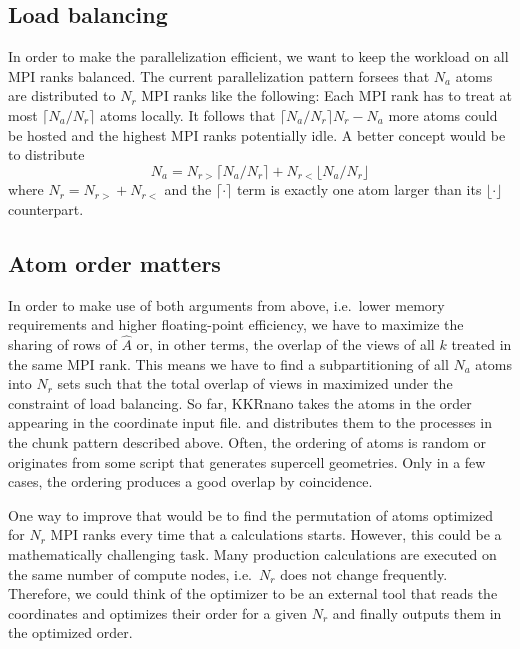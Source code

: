 \documentclass[a4paper]{article}
\newcommand{\MPIrank}{MPI rank} %
\begin{document}
\subsection{Load balancing} \label{sec:load_balancing}

In order to make the parallelization efficient,
we want to keep the workload on all \MPIrank{}s balanced.
The current parallelization pattern forsees that $N_a$ atoms
are distributed to $N_r$ \MPIrank{}s like the following:
Each \MPIrank{} has to treat at most $\lceil N_a/N_r \rceil$ atoms locally.
It follows that $\lceil N_a/N_r \rceil N_r - N_a$ more atoms could be
hosted and the highest \MPIrank{}s potentially idle.
A better concept would be to distribute
\begin{equation}
 N_a = N_{r>} \lceil N_a/N_r \rceil + N_{r<} \lfloor N_a/N_r \rfloor
\end{equation}
where $N_r = N_{r>} + N_{r<}$ and 
the $\lceil \cdot \rceil$ term is exactly one atom larger than its $\lfloor \cdot \rfloor$ counterpart.

\subsection{Atom order matters} \label{sec:atom_order_matters}

In order to make use of both arguments from above,
i.e.~lower memory requirements and higher floating-point efficiency,
we have to maximize the sharing of rows of $\hat A$
or, in other terms, the overlap of the views of all $k$ treated in
the same \MPIrank{}.
This means we have to find a subpartitioning of all $N_a$ atoms into
$N_r$ sets such that the total overlap of views in maximized
under the constraint of load balancing.
So far, KKRnano takes the atoms in the order appearing in the coordinate input file.
and distributes them to the processes in the chunk pattern described above.
Often, the ordering of atoms is random or originates from some script that generates
supercell geometries. 
Only in a few cases, the ordering produces a good overlap by coincidence.

One way to improve that would be to find the permutation of atoms optimized for $N_r$ \MPIrank{}s
every time that a calculations starts. However, this could be a mathematically challenging task.
Many production calculations are executed on the same number of compute nodes, 
i.e.~$N_r$ does not change frequently.
Therefore, we could think of the optimizer to be an external tool that 
reads the coordinates and
optimizes their order for a given $N_r$
and finally outputs them in the optimized order.
\end{document}
